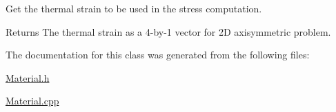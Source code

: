 Get the thermal strain to be used in the stress computation. 

\begin{DoxyReturn}{Returns}
The thermal strain as a 4-\/by-\/1 vector for 2D axisymmetric problem. 
\end{DoxyReturn}


The documentation for this class was generated from the following files\+:\begin{DoxyCompactItemize}
\item 
\mbox{\hyperlink{_material_8h}{Material.\+h}}\item 
\mbox{\hyperlink{_material_8cpp}{Material.\+cpp}}\end{DoxyCompactItemize}
